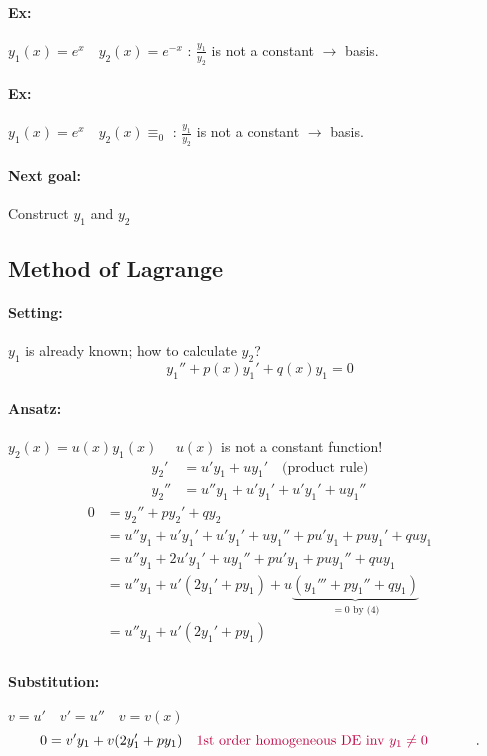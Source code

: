 \documentclass[]{article}
\begin{document}
\paragraph{Ex:} $y_1(x)= e ^{x}\quad y_2(x)=e ^{-x}$ :
$ \frac{y_1}{y_2}$ is not a constant $\to$ basis.
\paragraph{Ex:} $y_1(x)= e ^{x}\quad y_2(x)\equiv_0$ :
$ \frac{y_1}{y_2}$ is not a constant $\to$ basis.
\paragraph{Next goal:} Construct $y_1$ and $y_2$
\subsection{Method of Lagrange}
\paragraph{Setting:} $y_1$ is already known; how to calculate $y_2$?
\begin{equation}
y_1''+p(x)y_1'+q(x)y_1=0
\end{equation}
\paragraph{Ansatz:} $y_2(x)=u (x) y_1 (x) \quad$ $u(x)$ is not a constant function!
\[\begin{split}
	y_2' & = u'y_1+uy_1'\quad \text{(product rule)} \\
	y_2'' & =u''y_1+u'y_1'+u'y_1'+uy_1''
\end{split}\]
\[\begin{split}
	0 & = y_2''+py_2'+qy_2 \\
	 & = u''y_1+u'y_1'+u'y_1'+uy_1''+pu'y_1+puy_1'+quy_1\\
	 &= u''y_1+2u'y_1'+uy_1''+pu'y_1+puy_1''+quy_1\\
	 &= u''y_1+u'(2y_1'+py_1)+u \underbrace{(y_1'''+py_1''+qy_1)}_{=0 \text{ by (4)}}\\
	 &= u''y_1+u'(2y_1'+py_1)\\
\end{split}\]
\paragraph{Substitution:} $v=u'\quad v'=u''\quad v=v(x)$
 \[
0=v'y_1+v(2y_1'+py_1)\quad \parbox{20em}{ \textcolor{purple}{1st order homogeneous DE inv $y_1\not=0$}}
.\]
\end{document}

